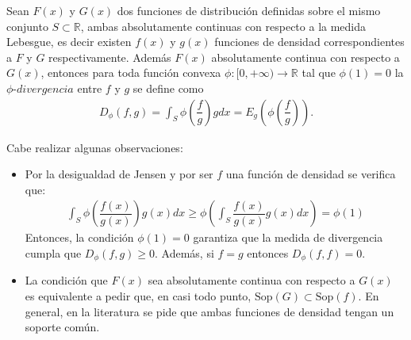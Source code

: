 \begin{definition}
	\label{fiDivergencia}
	Sean $F(x)$ y $G(x)$ dos funciones de distribución definidas sobre el mismo conjunto $S \subset \mathbb{R}$, ambas absolutamente continuas con respecto a la medida Lebesgue, es decir existen $f(x)$ y $g(x)$ funciones de densidad correspondientes a $F$ y $G$ respectivamente. Además $F(x)$ absolutamente continua con respecto a $G(x)$, entonces para toda función convexa $\phi:[0,+\infty)\longrightarrow \mathbb{R}$ tal que $\phi(1)=0$ la $\phi \text{-} divergencia$ entre $f$ y $g$ se define como
	\begin{align}
		D_{\phi}(f, g)=\int_{S}  \phi\left(\dfrac{f}{g}\right) g dx=E_{g}\left(\phi\left(\dfrac{f}{g}\right)\right).
	\end{align}
\end{definition}

Cabe realizar algunas observaciones:

\begin{itemize}
	\item Por la desigualdad de Jensen y por ser $f$ una función de densidad se verifica que:
	\begin{align}
	\displaystyle \int_{S} \phi\left(\dfrac{f(x)}{g(x)}\right) g(x) dx \geq \phi\left(\int_{S} \dfrac{f(x)}{g(x)} g(x) dx\right)=\phi(1)
\end{align}
    Entonces, la condición $\phi(1)=0$ garantiza que la medida de divergencia cumpla que $D_{\phi}(f, g) \geq 0.$ Además, si $f=g$ entonces $D_{\phi}(f, f)= 0.$ 
    \item La condición que $F(x)$ sea absolutamente continua con respecto a $G(x)$ es equivalente a pedir que, en casi todo punto, $\mathrm{Sop}(G) \subset \mathrm{Sop}(f)$. En general, en la literatura se pide que ambas funciones de densidad tengan un soporte común.
\end{itemize}

